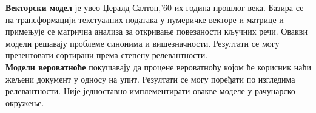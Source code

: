 \textbf{Векторски модел} је увео Џералд Салтон,'60-их година прошлог века. Базира се на трансформацији текстуалних података у нумеричке векторе и матрице и примењује се матрична анализа за откривање повезаности кључних речи. Овакви модели решавају проблеме синонима и вишезначности. Резултати се могу презентовати сортирани према степену релевантности.\cite{berry2005understanding}\\
\textbf{Модели вероватноће} покушавају да процене вероватноћу којом ће корисник наћи жељени документ у односу на упит. Резултати се могу поређати по изгледима релевантности. Није једноставно имплементирати овакве моделе у рачунарско окружење. \\
